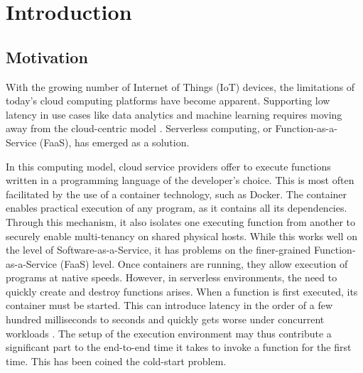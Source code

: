 \chapter{Introduction}
\label{chapter:introduction}



\newcommand{\inl}[1]{\texttt|#1|}

\newcommand{\quot}[1]{\foreignquote{german}{#1}}

\section{Motivation}

With the growing number of Internet of Things (IoT) devices, the limitations of today's cloud computing platforms have become apparent. Supporting low latency in use cases like data analytics and machine learning requires moving away from the cloud-centric model \cite{Nastic2017, Rausch2019}. Serverless computing, or Function-as-a-Service (FaaS), has emerged as a solution.


In this computing model, cloud service providers offer to execute functions written in a programming language of the developer's choice. This is most often facilitated by the use of a container technology, such as Docker. The container enables practical execution of any program, as it contains all its dependencies. Through this mechanism, it also isolates one executing function from another to securely enable multi-tenancy on shared physical hosts. While this works well on the level of Software-as-a-Service, it has problems on the finer-grained Function-as-a-Service (FaaS) level. Once containers are running, they allow execution of programs at native speeds. However, in serverless environments, the need to quickly create and destroy functions arises. When a function is first executed, its container must be started. This can introduce latency in the order of a few hundred milliseconds to seconds \cite{Manner2018, Wang2018} and quickly gets worse under concurrent workloads \cite{Mohan2019}. The setup of the execution environment may thus contribute a significant part to the end-to-end time it takes to invoke a function for the first time. This has been coined the cold-start problem.

